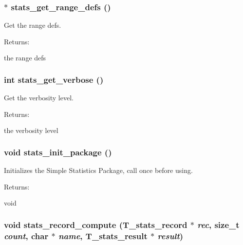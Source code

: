 \subsubsection{$\ast$ stats\_\-get\_\-range\_\-defs ()}\label{group__stats_a7}


Get the range defs.

\begin{Desc}
\item[Returns: ]\par
the range defs \end{Desc}
\subsubsection{\setlength{\rightskip}{0pt plus 5cm}int stats\_\-get\_\-verbose ()}\label{group__stats_a5}


Get the verbosity level.

\begin{Desc}
\item[Returns: ]\par
the verbosity level \end{Desc}
\subsubsection{\setlength{\rightskip}{0pt plus 5cm}void stats\_\-init\_\-package ()}\label{group__stats_a0}


Initializes the Simple Statistics Package, call once before using.

\begin{Desc}
\item[Returns: ]\par
void \end{Desc}
\subsubsection{\setlength{\rightskip}{0pt plus 5cm}void stats\_\-record\_\-compute ({\bf T\_\-stats\_\-record} $\ast$ {\em rec}, size\_\-t {\em count}, char $\ast$ {\em name}, {\bf T\_\-stats\_\-result} $\ast$ {\em result})}\label{group__stats_a4}


